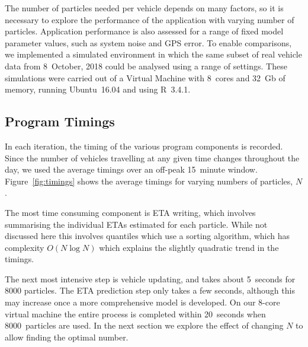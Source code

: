 The number of particles needed per vehicle 
depends on many factors,
so it is necessary to explore the performance of the application
with varying number of particles.
Application performance is also assessed
for a range of fixed model parameter values,
such as system noise and GPS error.
To enable comparisons, we implemented a simulated \rt environment
in which the same subset of real vehicle data from 8~October, 2018
could be analysed using a range of settings.
These simulations were carried out of a Virtual Machine 
with 8~cores and 32~Gb of memory, 
running Ubuntu~16.04 and using R~3.4.1.


\subsection{Program Timings}
\label{sec:timings}

In each iteration, 
the timing of the various program components is recorded.
Since the number of vehicles travelling at any given time changes throughout the day,
we used the average timings over an off-peak 15~minute window.
Figure~\ref{fig:timings} shows the average timings for 
varying numbers of particles, $N$.


The most time consuming component is ETA writing,
which involves summarising the individual ETAs estimated for each particle.
While not discussed here this involves quantiles which use a sorting algorithm,
which has complexity $O(N \log N)$ 
which explains the slightly quadratic trend in the timings.


The next most intensive step is vehicle updating,
and takes about 5~seconds for 8000 particles.
The ETA prediction step only takes a few seconds,
although this may increase once a more comprehensive model is developed.
On our 8-core virtual machine the entire process is completed within 20~seconds
when 8000~particles are used.
In the next section we explore the effect of changing $N$
to allow finding the optimal number.


